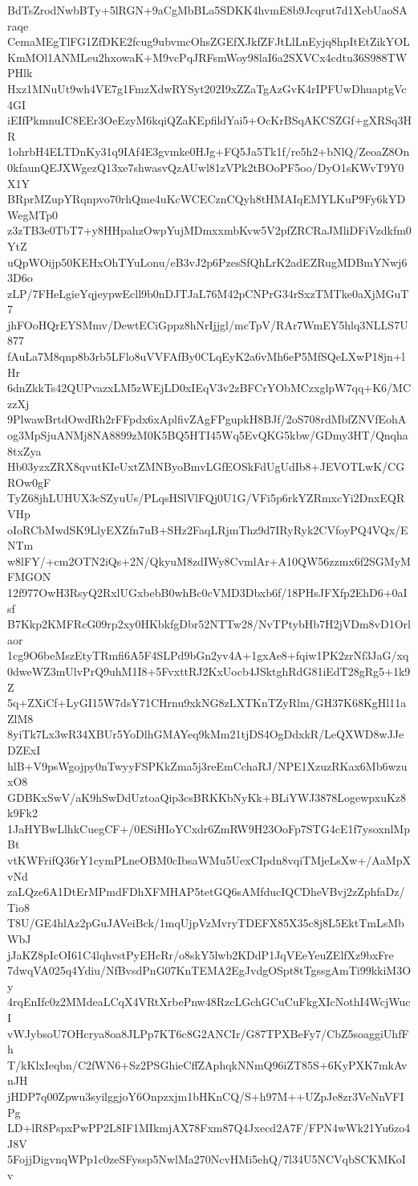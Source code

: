 BdTsZrodNwbBTy+5lRGN+9aCgMbBLa5SDKK4hvmE8b9Jcqrut7d1XebUaoSAraqe
CemaMEgTlFG1ZfDKE2fcug9ubvmcOhsZGEfXJkfZFJtLlLnEyjq8hpItEtZikYOL
KmMOl1ANMLeu2hxowaK+M9vcPqJRFsmWoy98laI6a2SXVCx4cdtu36S988TWPHlk
Hxz1MNuUt9wh4VE7g1FmzXdwRYSyt202I9xZZaTgAzGvK4rIPFUwDhuaptgVc4GI
iEIfPkmnuIC8EEr3OeEzyM6kqiQZaKEpfildYai5+OcKrBSqAKCSZGf+gXRSq3HR
1ohrbH4ELTDnKy31q9IAf4E3gvmke0HJg+FQ5Ja5Tk1f/re5h2+bNlQ/ZeoaZ8On
0kfaunQEJXWgezQ13xe7shwasvQzAUwl81zVPk2tBOoPF5oo/DyO1sKWvT9Y0X1Y
BRprMZupYRqnpvo70rhQme4uKcWCECznCQyh8tHMAIqEMYLKuP9Fy6kYDWegMTp0
z3zTB3e0TbT7+y8HHpahzOwpYujMDmxxmbKvw5V2pfZRCRaJMliDFiVzdkfm0YtZ
uQpWOijp50KEHxOhTYuLonu/eB3vJ2p6PzesSfQhLrK2adEZRugMDBmYNwj63D6o
zLP/7FHeLgieYqjeypwEcll9b0nDJTJaL76M42pCNPrG34rSxzTMTke0aXjMGuT7
jhFOoHQrEYSMmv/DewtECiGppz8hNrIjjgl/mcTpV/RAr7WmEY5hlq3NLLS7U877
fAuLa7M8qnp8b3rb5LFlo8uVVFAfBy0CLqEyK2a6vMh6eP5MfSQeLXwP18jn+lHr
6dnZkkTs42QUPvazxLM5zWEjLD0xIEqV3v2zBFCrYObMCzxglpW7qq+K6/MCzzXj
9PlwawBrtdOwdRh2rFFpdx6xAplfivZAgFPgupkH8BJf/2oS708rdMbfZNVfEohA
og3MpSjuANMj8NA8899zM0K5BQ5HTI45Wq5EvQKG5kbw/GDmy3HT/Qnqha8txZya
Hb03yzxZRX8qvutKIeUxtZMNByoBmvLGfEOSkFdUgUdIb8+JEVOTLwK/CGROw0gF
TyZ68jhLUHUX3cSZyuUs/PLqsHSlVlFQj0U1G/VFi5p6rkYZRmxcYi2DnxEQRVHp
oIoRCbMwdSK9LlyEXZfn7uB+SHz2FaqLRjmThz9d7IRyRyk2CVfoyPQ4VQx/ENTm
w8lFY/+cm2OTN2iQs+2N/QkyuM8zdIWy8CvmlAr+A10QW56zzmx6f2SGMyMFMGON
12f977OwH3RsyQ2RxlUGxbebB0whBc0cVMD3Dbxb6f/18PHsJFXfp2EhD6+0aIsf
B7Kkp2KMFRcG09rp2xy0HKbkfgDbr52NTTw28/NvTPtybHb7H2jVDm8vD1Orlaor
1cg9O6beMszEtyTRmfi6A5F4SLPd9bGn2yv4A+1gxAe8+fqiw1PK2zrNf3JaG/xq
0dweWZ3mUlvPrQ9uhM1I8+5FvxttRJ2KxUocb4JSktghRdG81iEdT28gRg5+1k9Z
5q+ZXiCf+LyGI15W7dsY71CHrnu9xkNG8zLXTKnTZyRlm/GH37K68KgHl11aZlM8
8yiTk7Lx3wR34XBUr5YoDlhGMAYeq9kMm21tjDS4OgDdxkR/LeQXWD8wJJeDZExI
hlB+V9psWgojpy0nTwyyFSPKkZma5j3reEmCchaRJ/NPE1XzuzRKax6Mb6wzuxO8
GDBKxSwV/aK9hSwDdUztoaQip3csBRKKbNyKk+BLiYWJ3878LogewpxuKz8k9Fk2
1JaHYBwLlhkCuegCF+/0ESiHIoYCxdr6ZmRW9H23OoFp7STG4cE1f7ysoxnlMpBt
vtKWFrifQ36rY1cymPLneOBM0cIbsaWMu5UexCIpdn8vqiTMjeLsXw+/AaMpXvNd
zaLQze6A1DtErMPmdFDhXFMHAP5tetGQ6sAMfducIQCDheVBvj2zZphfaDz/Tio8
T8U/GE4hlAz2pGuJAVeiBck/1mqUjpVzMvryTDEFX85X35c8j8L5EktTmLsMbWbJ
jJaKZ8pIcOI61C4lqhvstPyEHcRr/o8skY5lwb2KDdP1JqVEeYeuZElfXz9bxFre
7dwqVA025q4Ydiu/NfBvsdPnG07KnTEMA2EgJvdgOSpt8tTgssgAmTi99kkiM3Oy
4rqEnIfc0z2MMdeaLCqX4VRtXrbePnw48RzcLGchGCuCuFkgXIcNothI4WcjWucI
vWJybsoU7OHcrya8oa8JLPp7KT6c8G2ANCIr/G87TPXBeFy7/CbZ5soaggiUhfFh
T/kKlxIeqbn/C2fWN6+Sz2PSGhieCffZAphqkNNmQ96iZT85S+6KyPXK7mkAvnJH
jHDP7q00Zpwu3syilggjoY6Onpzxjm1bHKnCQ/S+h97M++UZpJe8zr3VeNnVFIPg
LD+lR8PspxPwPP2L8IF1MIkmjAX78Fxm87Q4Jxecd2A7F/FPN4wWk21Yu6zo4J8V
5FojjDigvnqWPp1c0zeSFyssp5NwlMa270NcvHMi5ehQ/7l34U5NCVqbSCKMKoIv
